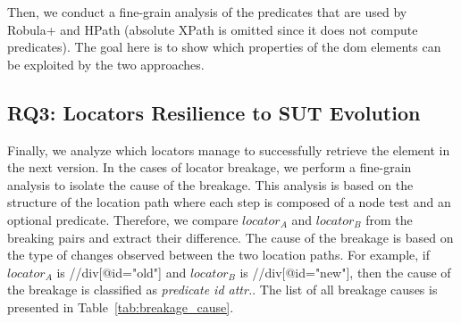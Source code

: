 Then, we conduct a fine-grain analysis of the predicates that are used by Robula+ and HPath (absolute XPath is omitted since it does not compute predicates). The goal here is to show which properties of the \gls{dom} elements can be exploited by the two approaches.

\subsection{RQ3: Locators Resilience to SUT Evolution}
\label{sec:hpath-protocol-rq3}

Finally, we analyze which locators manage to successfully retrieve the element in the next version. In the cases of locator breakage, we perform a fine-grain analysis to isolate the cause of the breakage. This analysis is based on the structure of the location path where each step is composed of a node test and an optional predicate. Therefore, we compare $locator_A$ and $locator_B$ from the breaking pairs and extract their difference. The cause of the breakage is based on the type of changes observed between the two location paths. For example, if $locator_A$ is //div[@id="old"] and $locator_B$ is //div[@id="new"], then the cause of the breakage is classified as \emph{predicate id attr.}. The list of all breakage causes is presented in Table~\ref{tab:breakage_cause}. 